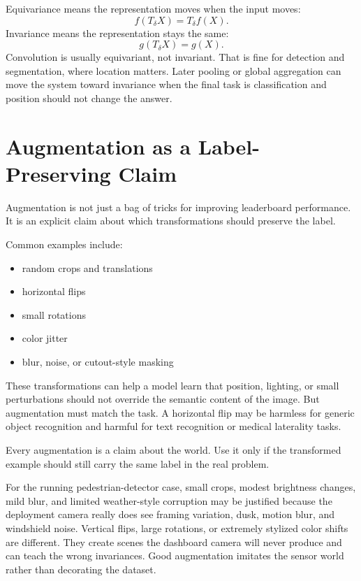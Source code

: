 \begin{mathlens}
Equivariance means the representation moves when the input moves:
\[
f(T_\delta X)=T_\delta f(X).
\]
Invariance means the representation stays the same:
\[
g(T_\delta X)=g(X).
\]
Convolution is usually equivariant, not invariant. That is fine for detection and segmentation, where location matters. Later pooling or global aggregation can move the system toward invariance when the final task is classification and position should not change the answer.
\end{mathlens}

\section{Augmentation as a Label-Preserving Claim}

Augmentation is not just a bag of tricks for improving leaderboard performance. It is an explicit claim about which transformations should preserve the label.

Common examples include:
\begin{itemize}[leftmargin=*]
\item random crops and translations
\item horizontal flips
\item small rotations
\item color jitter
\item blur, noise, or cutout-style masking
\end{itemize}

These transformations can help a model learn that position, lighting, or small perturbations should not override the semantic content of the image. But augmentation must match the task. A horizontal flip may be harmless for generic object recognition and harmful for text recognition or medical laterality tasks.

\begin{decisionbox}
Every augmentation is a claim about the world. Use it only if the transformed example should still carry the same label in the real problem.
\end{decisionbox}

\begin{example}
For the running pedestrian-detector case, small crops, modest brightness changes, mild blur, and limited weather-style corruption may be justified because the deployment camera really does see framing variation, dusk, motion blur, and windshield noise. Vertical flips, large rotations, or extremely stylized color shifts are different. They create scenes the dashboard camera will never produce and can teach the wrong invariances. Good augmentation imitates the sensor world rather than decorating the dataset.
\end{example}

